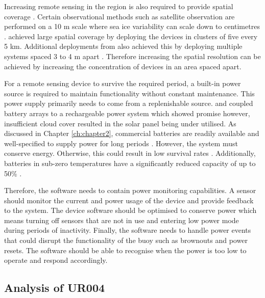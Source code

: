 Increasing remote sensing in the region is also required to provide spatial coverage \cite{albarello2020drift}. Certain observational methods such as satellite observation are performed on a 10 m scale \cite{galin2011validation} where sea ice variability can scale down to centimetres \cite{vichi2019effects}. \textcite{doble2017robust} achieved large spatial coverage by deploying the devices in clusters of five every 5 km. Additional deployments from \textcite{vichi2019effects,kohout2015device,albarello2020drift}
also achieved this by deploying multiple systems spaced 3 to 4 m apart \cite{vichi2019effects}. Therefore increasing the spatial resolution can be achieved by increasing the concentration of devices in an area spaced apart. \par 

For a remote sensing device to survive the required period, a built-in power source is required to maintain functionality without constant maintenance. This power supply primarily needs to come from a replenishable source. \textcite{doble2017robust} and \textcite{rabault2019open} coupled battery arrays to a rechargeable power system which showed promise however, insufficient cloud cover \cite{doble2017robust} resulted in the solar panel being under utilised. As discussed in Chapter \ref{ch:chapter2}, commercial batteries are readily available and well-specified to supply power for long periods \cite{rabault2017measurements}. However, the system must conserve energy. Otherwise, this could result in low survival rates \cite{kohout2015device}. Additionally, batteries in sub-zero temperatures have a significantly reduced capacity of up to 50\% \cite{doble2017robust}.

Therefore, the software needs to contain power monitoring capabilities. A sensor should monitor the current and power usage of the device and provide feedback to the system. The device software should be optimised to conserve power which means turning off sensors that are not in use and entering low power mode during periods of inactivity. Finally, the software needs to handle power events that could disrupt the functionality of the buoy such as brownouts and power resets. The software should be able to recognise when the power is too low to operate and respond accordingly.

\subsection{Analysis of UR004}

